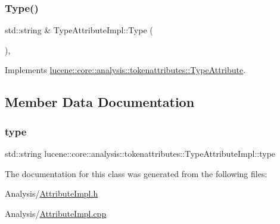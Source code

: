 \subsubsection{\texorpdfstring{Type()}{Type()}}
{\footnotesize\ttfamily std\+::string \& Type\+Attribute\+Impl\+::\+Type (\begin{DoxyParamCaption}{ }\end{DoxyParamCaption})\hspace{0.3cm}{\ttfamily [override]}, {\ttfamily [virtual]}}



Implements \mbox{\hyperlink{classlucene_1_1core_1_1analysis_1_1tokenattributes_1_1TypeAttribute_a85bef723dc92f76228982ff3907c5d04}{lucene\+::core\+::analysis\+::tokenattributes\+::\+Type\+Attribute}}.



\subsection{Member Data Documentation}
\mbox{\label{classlucene_1_1core_1_1analysis_1_1tokenattributes_1_1TypeAttributeImpl_ad5781cf6585610066317c74d5d4a4f1c}} 
\subsubsection{\texorpdfstring{type}{type}}
{\footnotesize\ttfamily std\+::string lucene\+::core\+::analysis\+::tokenattributes\+::\+Type\+Attribute\+Impl\+::type\hspace{0.3cm}{\ttfamily [private]}}



The documentation for this class was generated from the following files\+:\begin{DoxyCompactItemize}
\item 
Analysis/\mbox{\hyperlink{AttributeImpl_8h}{Attribute\+Impl.\+h}}\item 
Analysis/\mbox{\hyperlink{AttributeImpl_8cpp}{Attribute\+Impl.\+cpp}}\end{DoxyCompactItemize}
